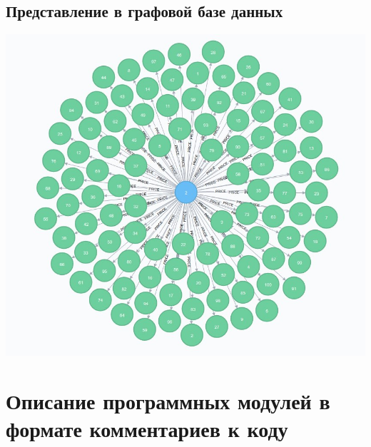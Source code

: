 \subsection{Представление в графовой базе данных}
\includegraphics[width=400bp]{img/graph.jpg}


\section{Описание программных модулей в формате комментариев к коду}

